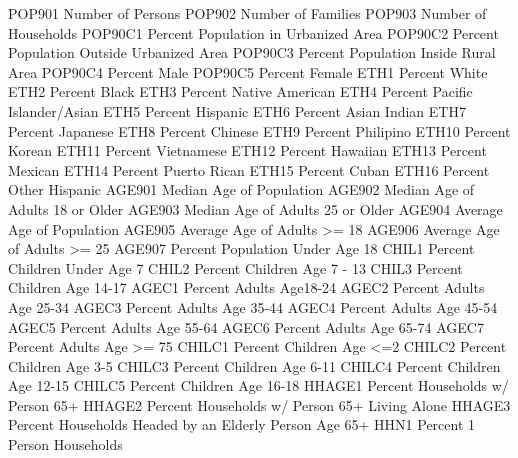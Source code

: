 \documentclass[
  11pt,
  a4paper,
  DIV=12,captions=tableheading,oneside,titlepage]{scrbook}
\let\oldverbatim\verbatim
\let\endoldverbatim\endverbatim
\renewenvironment{verbatim}{\footnotesize\oldverbatim}{\endoldverbatim}
\begin{document}
\begin{verbatim}
POP901                      Number of Persons
POP902                      Number of Families
POP903                      Number of Households
POP90C1                     Percent Population in Urbanized Area
POP90C2                     Percent Population Outside Urbanized Area
POP90C3                     Percent Population Inside Rural Area
POP90C4                     Percent Male
POP90C5                     Percent Female
ETH1                        Percent White
ETH2                        Percent Black
ETH3                        Percent Native American
ETH4                        Percent Pacific Islander/Asian
ETH5                        Percent Hispanic
ETH6                        Percent Asian Indian
ETH7                        Percent Japanese
ETH8                        Percent Chinese
ETH9                        Percent Philipino
ETH10                       Percent Korean
ETH11                       Percent Vietnamese
ETH12                       Percent Hawaiian
ETH13                       Percent Mexican
ETH14                       Percent Puerto Rican
ETH15                       Percent Cuban
ETH16                       Percent Other Hispanic
AGE901                      Median Age of Population
AGE902                      Median Age of Adults 18 or Older
AGE903                      Median Age of Adults 25 or Older
AGE904                      Average Age of Population
AGE905                      Average Age of Adults >= 18
AGE906                      Average Age of Adults >= 25
AGE907                      Percent Population Under Age 18
CHIL1                       Percent Children Under Age 7
CHIL2                       Percent Children Age 7 - 13
CHIL3                       Percent Children Age 14-17
AGEC1                       Percent Adults Age18-24
AGEC2                       Percent Adults Age 25-34
AGEC3                       Percent Adults Age 35-44
AGEC4                       Percent Adults Age 45-54
AGEC5                       Percent Adults Age 55-64
AGEC6                       Percent Adults Age 65-74
AGEC7                       Percent Adults Age >= 75
CHILC1                      Percent Children Age <=2
CHILC2                      Percent Children Age 3-5
CHILC3                      Percent Children Age 6-11
CHILC4                      Percent Children Age 12-15
CHILC5                      Percent Children Age 16-18
HHAGE1                      Percent Households w/ Person 65+
HHAGE2                      Percent Households w/ Person 65+ Living Alone
HHAGE3                      Percent Households Headed by an Elderly Person Age 65+
HHN1                        Percent 1 Person Households

\end{verbatim}
\end{document}
